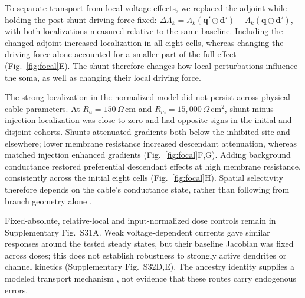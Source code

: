 \documentclass[11pt]{article}
\begin{document}
To separate transport from local voltage effects, we replaced the adjoint while holding the post-shunt driving force fixed: $\Delta\Lambda_k=\Lambda_k(\bm q'\odot\bm d')-\Lambda_k(\bm q\odot\bm d')$, with both localizations measured relative to the same baseline. Including the changed adjoint increased localization in all eight cells, whereas changing the driving force alone accounted for a smaller part of the full effect (Fig.~\ref{fig:focal}E). The shunt therefore changes how local perturbations influence the soma, as well as changing their local driving force.

The strong localization in the normalized model did not persist across physical cable parameters. At $R_a=150\,\Omega\,\mathrm{cm}$ and $R_m=15{,}000\,\Omega\,\mathrm{cm}^2$, shunt-minus-injection localization was close to zero and had opposite signs in the initial and disjoint cohorts. Shunts attenuated gradients both below the inhibited site and elsewhere; lower membrane resistance increased descendant attenuation, whereas matched injection enhanced gradients (Fig.~\ref{fig:focal}F,G). Adding background conductance restored preferential descendant effects at high membrane resistance, consistently across the initial eight cells (Fig.~\ref{fig:focal}H). Spatial selectivity therefore depends on the cable's conductance state, rather than following from branch geometry alone \citep{chance2002gain,destexhe2003highconductance}.

Fixed-absolute, relative-local and input-normalized dose controls remain in Supplementary Fig.~S31A. Weak voltage-dependent currents gave similar responses around the tested steady states, but their baseline Jacobian was fixed across doses; this does not establish robustness to strongly active dendrites or channel kinetics (Supplementary Fig.~S32D,E). The ancestry identity supplies a modeled transport mechanism \citep{gidon2012inhibition}, not evidence that these routes carry endogenous errors.
\end{document}
